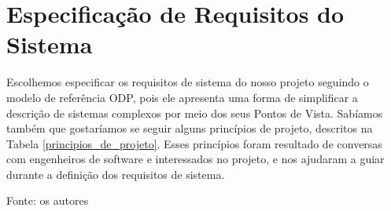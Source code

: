 \documentclass[twosideprint]{politex}
\newcommand{\legend}[1]{\begin{center}\def\caption{}\caption{#1}\end{center}}
\begin{document}
\chapter{Especificação de Requisitos do Sistema}
    Escolhemos especificar os requisitos de sistema do nosso projeto seguindo o modelo de referência ODP, pois ele apresenta uma forma de simplificar a descrição de sistemas complexos por meio dos seus Pontos de Vista.\cite{odppart1} Sabíamos também que gostaríamos se seguir alguns princípios de projeto, descritos na Tabela \ref{principios_de_projeto}. Esses princípios foram resultado de conversas com engenheiros de software e interessados no projeto, e nos ajudaram a guiar durante a definição dos requisitos de sistema.
    \begin{table}
        \centering
        \caption{Princípios de Projeto}
        \label{principios_de_projeto}
        \legend{Fonte: os autores}
    \end{table}
\end{document}
